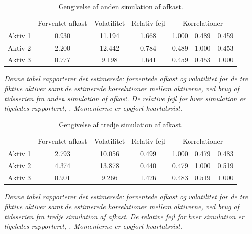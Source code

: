 \documentclass[
  a4paper,
  oneside]{memoir}
\begin{document}
\begin{table}[H]

\caption{\label{tab:sim2}Gengivelse af anden simulation af afkast.}
\centering
\begin{threeparttable}
\begin{tabular}[t]{lcccccc}
\toprule
\multicolumn{1}{c}{ } & \multicolumn{1}{c}{Forventet afkast} & \multicolumn{1}{c}{Volatilitet} & \multicolumn{1}{c}{Relativ fejl} & \multicolumn{3}{c}{Korrelationer} \\
\cmidrule(l{3pt}r{3pt}){2-2} \cmidrule(l{3pt}r{3pt}){3-3} \cmidrule(l{3pt}r{3pt}){4-4} \cmidrule(l{3pt}r{3pt}){5-7}
\rowcolor{gray!6}  Aktiv 1 & 0.930 & 11.194 & 1.668 & 1.000 & 0.489 & 0.459\\
Aktiv 2 & 2.200 & 12.442 & 0.784 & 0.489 & 1.000 & 0.453\\
\rowcolor{gray!6}  Aktiv 3 & 0.777 & 9.198 & 1.641 & 0.459 & 0.453 & 1.000\\
\bottomrule
\end{tabular}
\begin{tablenotes}
\item \textit{Denne tabel rapporterer det estimerede: forventede afkast og volatilitet for de tre fiktive aktiver samt de estimerede korrelationer mellem aktiverne, ved brug af tidsserien fra anden simulation af afkast. De relative fejl for hver simulation er ligeledes rapporteret, \citep{Asmussen2007}. Momenterne er opgjort kvartalsvist.}
\end{tablenotes}
\end{threeparttable}
\end{table}

\begin{table}[H]

\caption{\label{tab:sim3}Gengivelse af tredje simulation af afkast.}
\centering
\begin{threeparttable}
\begin{tabular}[t]{lcccccc}
\toprule
\multicolumn{1}{c}{ } & \multicolumn{1}{c}{Forventet afkast} & \multicolumn{1}{c}{Volatilitet} & \multicolumn{1}{c}{Relativ fejl} & \multicolumn{3}{c}{Korrelationer} \\
\cmidrule(l{3pt}r{3pt}){2-2} \cmidrule(l{3pt}r{3pt}){3-3} \cmidrule(l{3pt}r{3pt}){4-4} \cmidrule(l{3pt}r{3pt}){5-7}
\rowcolor{gray!6}  Aktiv 1 & 2.793 & 10.056 & 0.499 & 1.000 & 0.479 & 0.483\\
Aktiv 2 & 4.374 & 13.878 & 0.440 & 0.479 & 1.000 & 0.519\\
\rowcolor{gray!6}  Aktiv 3 & 0.901 & 9.266 & 1.426 & 0.483 & 0.519 & 1.000\\
\bottomrule
\end{tabular}
\begin{tablenotes}
\item \textit{Denne tabel rapporterer det estimerede: forventede afkast og volatilitet for de tre fiktive aktiver samt de estimerede korrelationer mellem aktiverne, ved brug af tidsserien fra tredje simulation af afkast. De relative fejl for hver simulation er ligeledes rapporteret, \citep{Asmussen2007}. Momenterne er opgjort kvartalsvist.}
\end{tablenotes}
\end{threeparttable}
\end{table}
\end{document}
